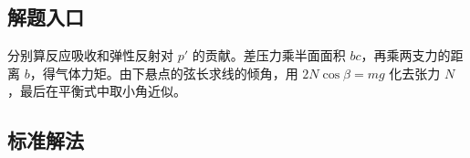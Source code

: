 \documentclass[UTF8,fontset=fandol,a4paper,11pt]{ctexart}
\begin{document}


\subsection*{解题入口}

分别算反应吸收和弹性反射对 $p'$ 的贡献。差压力乘半面面积 $bc$，再乘两支力的距离 $b$，得气体力矩。由下悬点的弦长求线的倾角，用 $2N\cos\beta=mg$ 化去张力 $N$，最后在平衡式中取小角近似。




\subsection*{标准解法}
\end{document}
